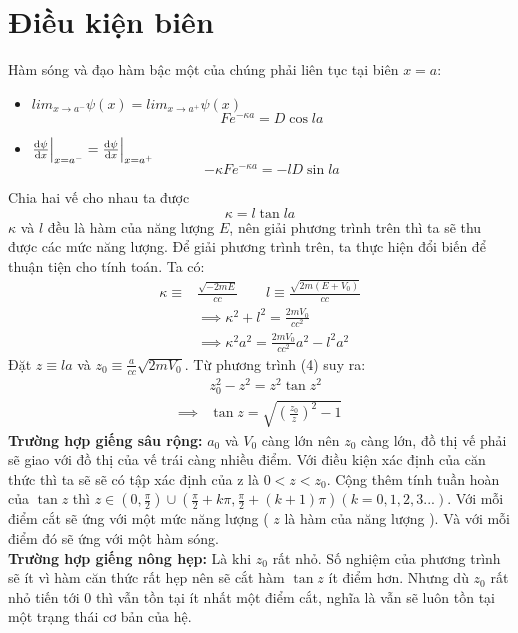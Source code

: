 \documentclass{article}
\begin{document}
	\section{Điều kiện biên}
	Hàm sóng và đạo hàm bậc một của chúng phải liên tục tại biên $x=a$:
	\begin{itemize}
		\item $lim_{x \rightarrow a^-} \psi(x) = lim_{x \rightarrow a^+} \psi(x)$
			\begin{equation}
				F e^{-\kappa a} = D \cos{la}
			\end{equation}
		\item $ \dv{\psi}{x} \Big|_{x=a^-} = \dv{\psi}{x} \Big|_{x=a^+} $
			\begin{equation}
				- \kappa F e^{-\kappa a} = - l D \sin{la}
			\end{equation}
	\end{itemize}
	Chia hai vế cho nhau ta được
	\begin{equation}
		\kappa = l \tan{la}
	\end{equation}
	$\kappa$ và $l$ đều là hàm của năng lượng $E$, nên giải phương trình trên thì ta sẽ thu được các mức năng lượng. Để giải phương trình trên, ta thực hiện đổi biến để thuận tiện cho tính toán.
	Ta có:
	\begin{align}
		\kappa  \equiv & \frac{\sqrt{-2mE}}{cc} \qquad l \equiv \frac{\sqrt{2m(E+V_0)}}{cc} \\ 
		&  \implies \kappa^2 + l^2 = \frac{2mV_0}{cc^2} \\
		&  \implies \kappa^2 a^2 = \frac{2mV_0}{cc^2} a^2 - l^2a^2
	\end{align}
	Đặt $z \equiv la$ và $z_0 \equiv \frac{a}{cc} \sqrt{2mV_0}$. Từ phương trình (4) suy ra:
	\begin{align}
		&z_0^2 - z^2 = z^2 \tan{z}^2 \\
		\implies &\tan{z} = \sqrt{\left(\frac{z_0}{z}\right)^2 -1}
	\end{align}
	\textbf{Trường hợp giếng sâu rộng:} $a_0$ và $V_0$ càng lớn nên $z_0$ càng lớn, đồ thị vế phải sẽ giao với đồ thị của vế trái càng nhiều điểm. Với điều kiện xác định của căn thức thì ta sẽ sẽ có tập xác định của z là $0 < z < z_0$. Cộng thêm tính tuần hoàn của $\tan{z}$ thì $z \in (0,\frac{\pi}{2}) \cup (\frac{\pi}{2} + k\pi , \frac{\pi}{2} + (k+1)\pi) (k= 0,1,2,3...)$. Với mỗi điểm cắt sẽ ứng với một mức năng lượng ( $z$ là hàm của năng lượng ). Và với mỗi điểm đó sẽ ứng với một hàm sóng. \\
	\textbf{Trường hợp giếng nông hẹp:} Là khi $z_0$ rất nhỏ. Số nghiệm của phương trình sẽ ít vì hàm căn thức rất hẹp nên sẽ cắt hàm $\tan{z}$ ít điểm hơn. Nhưng dù $z_0$ rất nhỏ tiến tới 0 thì vẫn tồn tại ít nhất một điểm cắt, nghĩa là vẫn sẽ luôn tồn tại một trạng thái cơ bản của hệ.
\end{document}
